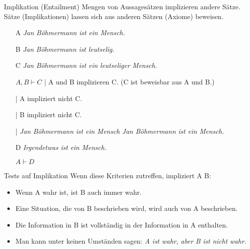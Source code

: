\begin{frame}
  {Implikation (Entailment)}
  \onslide<+->
  \onslide<+->
  Mengen von Aussagesätzen \alert{implizieren} andere Sätze.\\
  \onslide<+->
  Sätze (Implikationen) lassen sich aus anderen Sätzen (Axiome) \alert{beweisen}.\\
  \Halbzeile
  \begin{itemize}[<+->]
    \item[A] \textit{Jan Böhmermann ist ein Mensch.}
    \item[B] \textit{Jan Böhmermann ist leutselig.}
    \item[C] \textit{Jan Böhmermann ist ein leutseliger Mensch.}
      \Halbzeile
    \item[ ] \alert{$A,B\vdash C$} | A und B implizieren C. (C ist beweisbar aus A und B.)
    \item[ ]  | A impliziert nicht C.
    \item[ ]  | B impliziert nicht C.
      \Halbzeile
    \item[ ]  \onslide<+->| \textit{Jan Böhmermann ist ein Mensch  Jan Böhmermann ist ein Mensch.}
      \Halbzeile
    \item[D] \textit{Irgendetwas ist ein Mensch.}
    \item[ ] \alert{$A\vdash D$} 
  \end{itemize}
\end{frame}

\begin{frame}
  {Tests auf Implikation}
  \onslide<+->
  \onslide<+->
  Wenn diese Kriterien zutreffen, impliziert A B:\\
  \Zeile
  \begin{itemize}[<+->]
    \item Wenn A wahr ist, ist B auch immer wahr.
    \item Eine Situation, die von B beschrieben wird, wird auch von A beschrieben.
    \item Die Information in B ist vollständig in der Information in A enthalten.
    \item Man kann unter keinen Umständen sagen: \textit{A ist wahr, aber B ist nicht wahr.}
  \end{itemize}
\end{frame}


